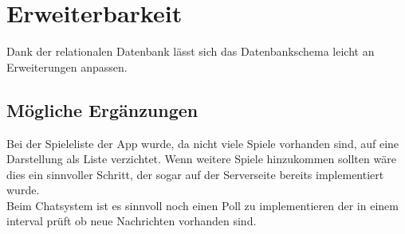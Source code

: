 \chapter{Erweiterbarkeit}
Dank der relationalen Datenbank lässt sich das Datenbankschema leicht an Erweiterungen anpassen. 
\section{Mögliche Ergänzungen}
Bei der Spieleliste der App wurde, da nicht viele Spiele vorhanden sind, auf eine Darstellung als Liste verzichtet. Wenn weitere Spiele hinzukommen sollten wäre dies ein sinnvoller Schritt, der sogar auf der Serverseite bereits implementiert wurde.\\
Beim Chatsystem ist es sinnvoll noch einen Poll zu implementieren der in einem interval prüft ob neue Nachrichten vorhanden sind.
